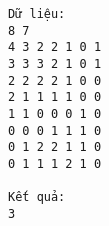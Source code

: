 \begin{verbatim}
Dữ liệu:
8 7
4 3 2 2 1 0 1
3 3 3 2 1 0 1
2 2 2 2 1 0 0
2 1 1 1 1 0 0
1 1 0 0 0 1 0
0 0 0 1 1 1 0
0 1 2 2 1 1 0
0 1 1 1 2 1 0

Kết quả:
3
\end{verbatim}